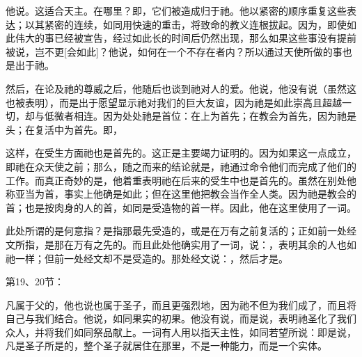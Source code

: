 他说。这适合天主。在哪里？即，它们被造成归于祂。他以紧密的顺序重复这些表达；以其紧密的连续，如同用快速的重击，将致命的教义连根拔起。因为，即使如此伟大的事已经被宣告，经过如此长的时间后仍然出现，那么如果这些事没有提前被说，岂不更[会如此]？他说，如何在一个不存在者内？所以通过天使所做的事也是出于祂。\par

\par

然后，在论及祂的尊威之后，他随后也谈到祂对人的爱。他说，他没有说（虽然这也被表明），而是出于愿望显示祂对我们的巨大友谊，因为祂是如此崇高且超越一切，却与低微者相连。因为处处祂是首位：在上为首先；在教会为首先，因为祂是头；在复活中为首先。即，\par

这样，在受生方面祂也是首先的。这正是主要竭力证明的。因为如果这一点成立，即祂在众天使之前；那么，随之而来的结论就是，祂通过命令他们而完成了他们的工作。而真正奇妙的是，他着重表明祂在后来的受生中也是首先的。虽然在别处他称亚当为首，事实上他确是如此；但在这里他把教会当作全人类。因为祂是教会的首；也是按肉身的人的首，如同是受造物的首一样。因此，他在这里使用了一词。\par

此处所谓的是何意指？是指那最先受造的，或是在万有之前复活的；正如前一处经文所指，是那在万有之先的。而且此处他确实用了一词，说：，表明其余的人也如祂一样；但前一处经文却不是受造的。那处经文说：，然后才是。\par

第19、20节：\par

凡属于父的，他也说也属于圣子，而且更强烈地，因为祂不但为我们成了，而且将自己与我们结合。他说，如同果实的初果。他没有说，而是说，表明祂圣化了我们众人，并将我们如同祭品献上。一词有人用以指天主性，如同若望所说：即是说，凡是圣子所是的，整个圣子就居住在那里，不是一种能力，而是一个实体。\par

